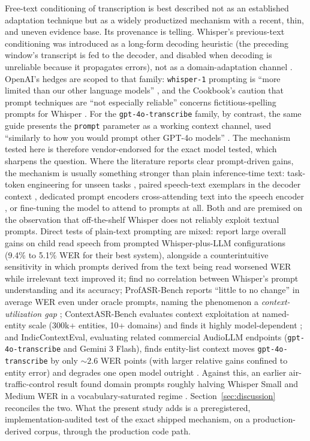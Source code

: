 \documentclass[11pt]{article}
\begin{document}
Free-text conditioning of transcription is best described not as an established adaptation technique but as a widely productized mechanism with a recent, thin, and uneven evidence base. Its provenance is telling. Whisper's previous-text conditioning was introduced as a long-form decoding heuristic (the preceding window's transcript is fed to the decoder, and disabled when decoding is unreliable because it propagates errors), not as a domain-adaptation channel \citep{radford23}. OpenAI's hedges are scoped to that family: \texttt{whisper-1} prompting is ``more limited than our other language models'' \citep{openai26a}, and the Cookbook's caution that prompt techniques are ``not especially reliable'' concerns fictitious-spelling prompts for Whisper \citep{openai26b}. For the \texttt{gpt-4o-transcribe} family, by contrast, the same guide presents the \texttt{prompt} parameter as a working context channel, used ``similarly to how you would prompt other GPT-4o models'' \citep{openai26a}. The mechanism tested here is therefore vendor-endorsed for the exact model tested, which sharpens the question. Where the literature reports clear prompt-driven gains, the mechanism is usually something stronger than plain inference-time text: task-token engineering for unseen tasks \citep{peng23}, paired speech-text exemplars in the decoder context \citep{wang24}, dedicated prompt encoders cross-attending text into the speech encoder \citep{yang24b}, or fine-tuning the model to attend to prompts at all. Both \citet{liao23} and \citet{shamsian24} are premised on the observation that off-the-shelf Whisper does not reliably exploit textual prompts. Direct tests of plain-text prompting are mixed: \citet{gao25} report large overall gains on child read speech from prompted Whisper-plus-LLM configurations (9.4\% to 5.1\% WER for their best system), alongside a counterintuitive sensitivity in which prompts derived from the text being read worsened WER while irrelevant text improved it; \citet{yang24a} find no correlation between Whisper's prompt understanding and its accuracy; ProfASR-Bench reports ``little to no change'' in average WER even under oracle prompts, naming the phenomenon a \emph{context-utilization gap} \citep{piskala25}; ContextASR-Bench evaluates context exploitation at named-entity scale (300k+ entities, 10+ domains) and finds it highly model-dependent \citep{wang25}; and IndicContextEval, evaluating related commercial AudioLLM endpoints (\texttt{gpt-4o-transcribe} and Gemini 3 Flash), finds entity-list context moves \texttt{gpt-4o-transcribe} by only ${\sim}2.6$ WER points (with larger relative gains confined to entity error) and degrades one open model outright \citep{joshi26}. Against this, an earlier air-traffic-control result found domain prompts roughly halving Whisper Small and Medium WER in a vocabulary-saturated regime \citep{cochran24}. Section~\ref{sec:discussion} reconciles the two. What the present study adds is a preregistered, implementation-audited test of the exact shipped mechanism, on a production-derived corpus, through the production code path.
\end{document}
